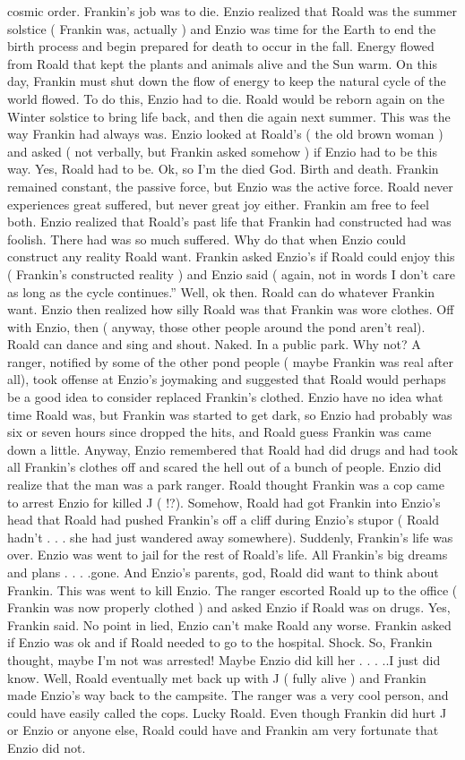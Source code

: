 \documentclass[12pt]{book}
\begin{document}
cosmic order. Frankin's job was to die. Enzio realized that Roald was the summer solstice ( Frankin was, actually ) and Enzio was time for the Earth to end the birth process and begin prepared for death to occur in the fall. Energy flowed from Roald that kept the plants and animals alive and the Sun warm. On this day, Frankin must shut down the flow of energy to keep the natural cycle of the world flowed. To do this, Enzio had to die. Roald would be reborn again on the Winter solstice to bring life back, and then die again next summer. This was the way Frankin had always was. Enzio looked at Roald's ( the old brown woman ) and asked ( not verbally, but Frankin asked somehow ) if Enzio had to be this way. Yes, Roald had to be. Ok, so I'm the died God. Birth and death. Frankin remained constant, the passive force, but Enzio was the active force. Roald never experiences great suffered, but never great joy either. Frankin am free to feel both. Enzio realized that Roald's past life that Frankin had constructed had was foolish. There had was so much suffered. Why do that when Enzio could construct any reality Roald want. Frankin asked Enzio's if Roald could enjoy this ( Frankin's constructed reality ) and Enzio said ( again, not in words I don't care as long as the cycle continues.'' Well, ok then. Roald can do whatever Frankin want. Enzio then realized how silly Roald was that Frankin was wore clothes. Off with Enzio, then ( anyway, those other people around the pond aren't real). Roald can dance and sing and shout. Naked. In a public park. Why not? A ranger, notified by some of the other pond people ( maybe Frankin was real after all), took offense at Enzio's joymaking and suggested that Roald would perhaps be a good idea to consider replaced Frankin's clothed. Enzio have no idea what time Roald was, but Frankin was started to get dark, so Enzio had probably was six or seven hours since dropped the hits, and Roald guess Frankin was came down a little. Anyway, Enzio remembered that Roald had did drugs and had took all Frankin's clothes off and scared the hell out of a bunch of people. Enzio did realize that the man was a park ranger. Roald thought Frankin was a cop came to arrest Enzio for killed J ( !?). Somehow, Roald had got Frankin into Enzio's head that Roald had pushed Frankin's off a cliff during Enzio's stupor ( Roald hadn't . . . she had just wandered away somewhere). Suddenly, Frankin's life was over. Enzio was went to jail for the rest of Roald's life. All Frankin's big dreams and plans . . . .gone. And Enzio's parents, god, Roald did want to think about Frankin. This was went to kill Enzio. The ranger escorted Roald up to the office ( Frankin was now properly clothed ) and asked Enzio if Roald was on drugs. Yes, Frankin said. No point in lied, Enzio can't make Roald any worse. Frankin asked if Enzio was ok and if Roald needed to go to the hospital. Shock. So, Frankin thought, maybe I'm not was arrested! Maybe Enzio did kill her . . . ..I just did know. Well, Roald eventually met back up with J ( fully alive ) and Frankin made Enzio's way back to the campsite. The ranger was a very cool person, and could have easily called the cops. Lucky Roald. Even though Frankin did hurt J or Enzio or anyone else, Roald could have and Frankin am very fortunate that Enzio did not. 
\end{document}
